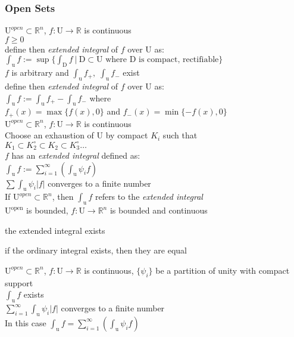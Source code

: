 \subsubsection{Open Sets}
\LET $\mathrm{U}^{open}\subset\mathbb{R}^n$,
$f:\mathrm{U}\to\mathbb{R}$ is continuous\\
\IF $f\geq 0$\\
\THEN define then \textit{extended integral} of $f$ over U as:\\
$\int_{\mathrm{u}}f := \sup\{\int_{\mathrm{D}}f\:|\:
\mathrm{D}\subset\mathrm{U}\text{ where } \mathrm{D}\text{ is compact, rectifiable} \}$\\
\IF $f$ is arbitrary and
 $\int_{\mathrm{u}}f_+,\;\int_{\mathrm{u}}f_-$ exist\\
\THEN define then \textit{extended integral} of $f$ over U as:\\
$\int_{\mathrm{u}}f:=\int_{\mathrm{u}}f_+-\int_{\mathrm{u}}f_-$ where\\
$f_+(x)=\max\{f(x),0\}$ and $f_-(x)=\min\{-f(x), 0\}$\\

\LET $\mathrm{U}^{open}\subset\mathbb{R}^n$,
$f:\mathrm{U}\to\mathbb{R}$ is continuous\\
Choose an exhaustion of U by compact $K_i$ such that\\
$K_1\subset K_2^{\circ}\subset K_2\subset K_3^{\circ}\ldots$\\
\THEN $f$ has an \textit{extended integral} defined as:\\
$\int_{\mathrm{u}}f:=\sum_{i=1}^{\infty}(\int_{\mathrm{u}}\psi_if)$\\
\IFF $\sum\int_{\mathrm{u}}\psi_i|f|$ converges to a finite number\\

\RMK
If $\mathrm{U}^{open}\subset\mathbb{R}^n$, then $\int_{\mathrm{u}}f$ refers to the
\textit{extended integral}\\

\LET
 $\mathrm{U^{open}}$ is bounded,
$f:\mathrm{U}\to\mathbb{R}^n $ is bounded and continuous\\
\THEN
\begin{myenumerate}
\item the extended integral exists
\item if the ordinary integral exists, then they are equal
\end{myenumerate}

\LET
$\mathrm{U}^{open}\subset\mathbb{R}^n$,
$f:\mathrm{U}\to\mathbb{R}$ is continuous,
$\{\psi_i\}$ be a partition of unity with compact support\\
\THEN $\int_{\mathrm{u}}f$ exists\\
\IFF $\sum_{i=1}^{\infty}\int_{\mathrm{u}}\psi_i|f|$ converges to a finite number\\
In this case $\int_{\mathrm{u}}f =\sum\limits_{i=1}^
\infty(\int_{\mathrm{u}}\psi_i f)$\\

